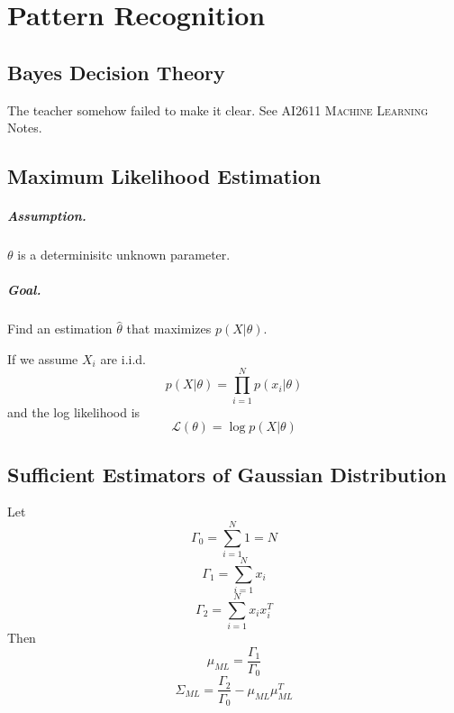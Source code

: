 \chapter{Pattern Recognition}
\newpage


\section{Bayes Decision Theory}
    The teacher somehow failed to make it clear. See \textsc{AI2611 Machine Learning} Notes.

\section{Maximum Likelihood Estimation}
    \paragraph{Assumption.} $\theta$ is a determinisitc unknown parameter.
    \paragraph{Goal.} Find an estimation $\hat{\theta}$ that maximizes $p(X|\theta)$.
    
    If we assume $X_i$ are i.i.d.
    \[ p(X|\theta) = \prod_{i=1}^N p(x_i|\theta) \]
    and the log likelihood is
    \[ \mathcal{L}(\theta) = \log p(X|\theta) \]

\section{Sufficient Estimators of Gaussian Distribution}
    Let
    \[ \Gamma_0 = \sum_{i=1}^N 1 = N \]
    \[ \Gamma_1 = \sum_{i=1}^N x_i \]
    \[ \Gamma_2 = \sum_{i=1}^N x_ix_i^T \]
    Then
    \[ \mu_{ML} = \frac{\Gamma_1}{\Gamma_0} \]
    \[ \Sigma_{ML} = \frac{\Gamma_2}{\Gamma_0} - \mu_{ML}\mu_{ML}^T \]
